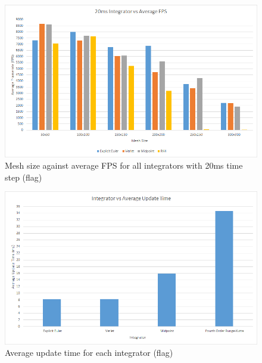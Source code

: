 \begin{landscape}
    \begin{figure}[!htb]
    \begin{center}
      \includegraphics{Figures/flag_20ms_int_fps}
    \end{center}
    \caption{Mesh size against average FPS for all integrators with 20ms time step (flag)}
    \label{fig:20ms fps flag}
  \end{figure}
  
    \begin{figure}[!htb]
    \begin{center}
      \includegraphics{Figures/flag_int_ut}
    \end{center}
    \caption{Average update time for each integrator (flag)}
    \label{fig:ut flag}
  \end{figure}
  
\end{landscape}